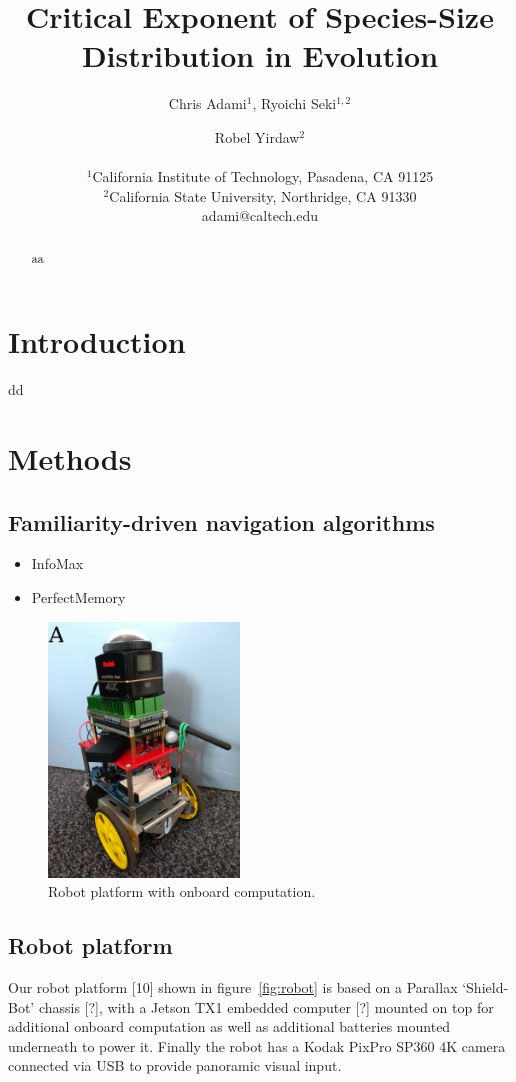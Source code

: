 \documentclass[letterpaper]{article}
\title{Critical Exponent of Species-Size Distribution in Evolution}
\author{Chris Adami$^{1}$, Ryoichi Seki$^{1,2}$ \and Robel Yirdaw$^2$ \\
\mbox{}\\
$^1$California Institute of Technology, Pasadena, CA 91125 \\
$^2$California State University, Northridge, CA 91330 \\
adami@caltech.edu} %
\begin{document}
\maketitle

\begin{abstract}
  aa
\end{abstract}

\section{Introduction}
dd

\section{Methods}
\subsection{Familiarity-driven navigation algorithms}
\begin{itemize}
    \item InfoMax
    \item PerfectMemory
\end{itemize}

\begin{figure}[t]
    \centering
    \includegraphics[width=2in]{figures/robot.jpg}
    \caption{Robot platform with onboard computation.}
    \label{robot}
\end{figure}

\subsection{Robot platform}
\label{robot_platform}
Our robot platform [10] shown in figure~\ref{fig:robot} is based on a Parallax ‘Shield-Bot’ chassis [?], with a Jetson TX1 embedded computer [?] mounted on top for additional onboard computation as well as additional batteries mounted underneath to power it. 
Finally the robot has a Kodak PixPro SP360 4K camera connected via USB to provide panoramic visual input.
\end{document}
